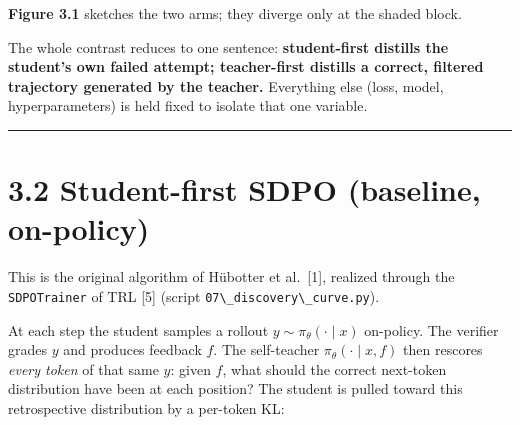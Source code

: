 \textbf{Figure 3.1} sketches the two arms; they diverge only at the shaded block.

\begin{center}\end{center}

The whole contrast reduces to one sentence: \textbf{student-first distills the student's own failed attempt; teacher-first distills a correct, filtered trajectory generated by the teacher.} Everything else (loss, model, hyperparameters) is held fixed to isolate that one variable.

\begin{center}\rule{0.5\linewidth}{0.5pt}\end{center}

\section{3.2 Student-first SDPO (baseline, on-policy)}\label{student-first-sdpo-baseline-on-policy}

This is the original algorithm of Hübotter et al.~{[}1{]}, realized through the \passthrough{\lstinline!SDPOTrainer!} of TRL {[}5{]} (script \passthrough{\lstinline!07\_discovery\_curve.py!}).

At each step the student samples a rollout \(y \sim \pi_\theta(\cdot \mid x)\) on-policy. The verifier grades \(y\) and produces feedback \(f\). The self-teacher \(\pi_\theta(\cdot \mid x, f)\) then rescores \emph{every token} of that same \(y\): given \(f\), what should the correct next-token distribution have been at each position? The student is pulled toward this retrospective distribution by a per-token KL:

